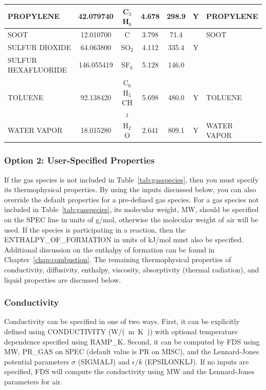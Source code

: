 \documentclass[11pt]{book}
\begin{document}
\begin{longtable}{@{\extracolsep{\fill}}|l|c|c|c|c|c|l|}
{\ct PROPYLENE}          & 42.079740  & C$_3$H$_6$       & 4.678    & 298.9    &  Y       &  {\ct PROPYLENE}           \\ \hline
{\ct SOOT}               & 12.010700  & C                & 3.798    & 71.4     &          &  {\ct SOOT}                \\ \hline
{\ct SULFUR DIOXIDE}     & 64.063800  & SO$_2$           & 4.112    & 335.4    &  Y       &                            \\ \hline
{\ct SULFUR HEXAFLUORIDE}& 146.055419 & SF$_6$           & 5.128    & 146.0    &          &                            \\ \hline
{\ct TOLUENE}            & 92.138420  & C$_6$H$_5$CH$_3$ & 5.698    & 480.0    &  Y       &  {\ct TOLUENE}             \\ \hline
{\ct WATER VAPOR}        & 18.015280  & H$_2$O           & 2.641    & 809.1    &  Y       &  {\ct WATER VAPOR}         \\ \hline
\end{longtable}


\subsubsection{Option 2: User-Specified Properties}

If the gas species is not included in Table~\ref{tab:gasspecies}, then you must specify its thermophysical properties.  By using the inputs discussed below, you can also override the default properties for a pre-defined gas species.  For a gas species not included in Table~\ref{tab:gasspecies}, its molecular weight, {\ct MW}, should be specified on the {\ct SPEC} line in units of g/mol, otherwise the molecular weight of air will be used.  If the species is participating in a reaction, then the {\ct ENTHALPY\_OF\_FORMATION} in units of kJ/mol must also be specified. Additional discussion on the enthalpy of formation can be found in Chapter~\ref{chap:combustion}.  The remaining thermophysical properties of conductivity, diffusivity, enthalpy, viscosity, absorptivity (thermal radiation), and liquid properties are discussed below.

\subsubsection{Conductivity}

Conductivity can be specified in one of two ways.  First, it can be explicitly defined using {\ct CONDUCTIVITY} (\si{W/(m.K)}) with optional temperature dependence specified using {\ct RAMP\_K}.  Second, it can be computed by FDS using {\ct MW}, {\ct PR\_GAS} on {\ct SPEC} (default value is {\ct PR} on {\ct MISC}), and the Lennard-Jones potential parameters $\sigma$ ({\ct SIGMALJ}) and $\epsilon/k$ ({\ct EPSILONKLJ}).  If no inputs are specified, FDS will compute the conductivity using {\ct MW} and the Lennard-Jones parameters for air.
\end{document}
